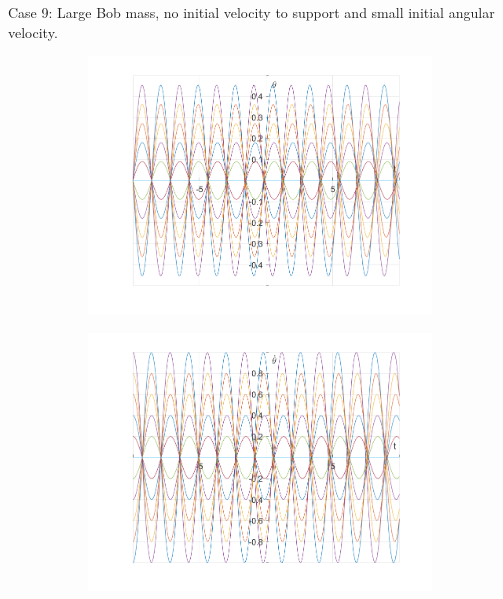 \documentclass{article}
\begin{document}
	Case 9:
	Large Bob mass, no initial velocity to support and small initial angular velocity.
	\begin{figure}[h!]
		\centering
		\begin{subfigure}[b]{0.48\linewidth}
			\includegraphics[width=\linewidth]{./SmallOscillations/S9/F1.png}
		\end{subfigure}
		\begin{subfigure}[b]{0.48\linewidth}
			\includegraphics[width=\linewidth]{./SmallOscillations/S9/F2.png}
		\end{subfigure}
	\end{figure}
	
\end{document}
